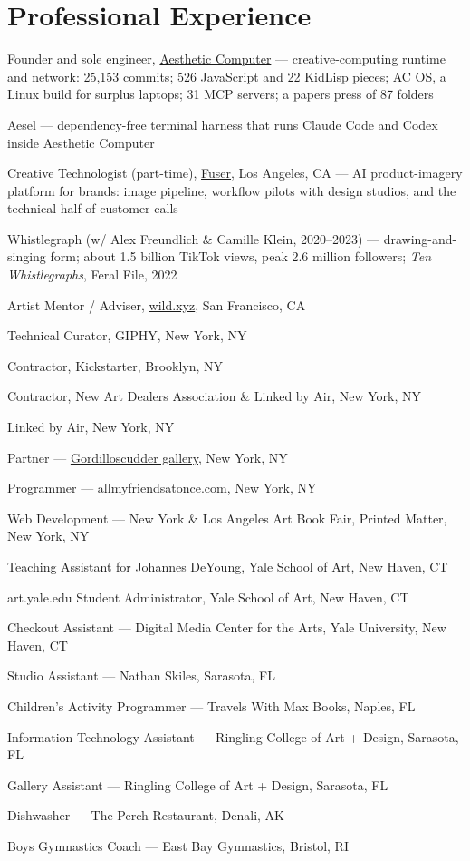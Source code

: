 \documentclass[10pt,letterpaper]{article}
\newlength{\cvyearwidth}
\newenvironment{cvlist}{%
  \begin{list}{}{%
    \setlength{\leftmargin}{\cvyearwidth}%
    \setlength{\labelwidth}{\cvyearwidth}%
    \setlength{\labelsep}{0.4em}%
    \setlength{\itemsep}{0.15em}%
    \setlength{\parsep}{0pt}%
    \setlength{\topsep}{0.2em}%
    \renewcommand{\makelabel}[1]{\color{acgray}\small ##1\hfill}%
  }%
}{\end{list}}
\newcommand{\cv}[2]{\item[#1] #2}
\begin{document}
\section*{Professional Experience}
\begin{cvlist}
  \cv{2021--}{Founder and sole engineer, \href{https://aesthetic.computer}{Aesthetic Computer} --- creative-computing runtime and network: 25,153 commits; 526 JavaScript and 22 KidLisp pieces; AC OS, a Linux build for surplus laptops; 31 MCP servers; a papers press of 87 folders}
  \cv{2026--}{Aesel --- dependency-free terminal harness that runs Claude Code and Codex inside Aesthetic Computer}
\cv{2026--}{Creative Technologist (part-time), \href{https://fuser.studio}{Fuser}, Los Angeles, CA --- AI product-imagery platform for brands: image pipeline, workflow pilots with design studios, and the technical half of customer calls}
  \cv{2019--}{Whistlegraph (w/ Alex Freundlich \& Camille Klein, 2020--2023) --- drawing-and-singing form; about 1.5 billion TikTok views, peak 2.6 million followers; \emph{Ten Whistlegraphs}, Feral File, 2022}
  \cv{2021}{Artist Mentor / Adviser, \href{https://wild.xyz}{wild.xyz}, San Francisco, CA}
  \cv{2017}{Technical Curator, GIPHY, New York, NY}
  \cv{2016}{Contractor, Kickstarter, Brooklyn, NY}
  \cv{2016}{Contractor, New Art Dealers Association \& Linked by Air, New York, NY}
  \cv{2013--2014}{Linked by Air, New York, NY}
  \cv{2013--2014}{Partner --- \href{http://gordilloscudder.com}{Gordilloscudder gallery}, New York, NY}
  \cv{2013}{Programmer --- allmyfriendsatonce.com, New York, NY}
  \cv{2012--2013}{Web Development --- New York \& Los Angeles Art Book Fair, Printed Matter, New York, NY}
  \cv{2012}{Teaching Assistant for Johannes DeYoung, Yale School of Art, New Haven, CT}
  \cv{2012}{art.yale.edu Student Administrator, Yale School of Art, New Haven, CT}
  \cv{2012}{Checkout Assistant --- Digital Media Center for the Arts, Yale University, New Haven, CT}
  \cv{2011}{Studio Assistant --- Nathan Skiles, Sarasota, FL}
  \cv{2010}{Children's Activity Programmer --- Travels With Max Books, Naples, FL}
  \cv{2010}{Information Technology Assistant --- Ringling College of Art + Design, Sarasota, FL}
  \cv{2009}{Gallery Assistant --- Ringling College of Art + Design, Sarasota, FL}
  \cv{2007}{Dishwasher --- The Perch Restaurant, Denali, AK}
  \cv{2004--2006}{Boys Gymnastics Coach --- East Bay Gymnastics, Bristol, RI}
\end{cvlist}
\end{document}
